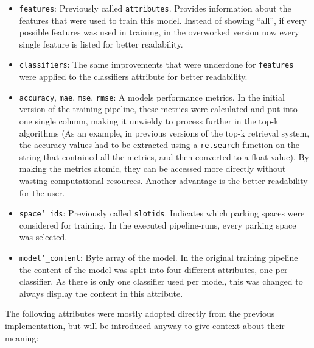 \begin{itemize}
\item  \texttt{features}: Previously called \texttt{attributes}. Provides information about the features that were used to train this model. Instead of showing “all”, if every possible features was used in training, in the overworked version now every single feature is listed for better readability. 
\item  \texttt{classifiers}:  The same improvements that were underdone for \texttt{features} were applied to the classifiers attribute for better readability. 
\item  \texttt{accuracy}, \texttt{mae}, \texttt{mse}, \texttt{rmse}: A models performance metrics. In the initial version of the training pipeline, these metrics were calculated and put into one single column, making it unwieldy to process further in the top-k algorithms (As an example, in previous versions of the top-k retrieval system, the accuracy values had to be extracted using a \texttt{re.search} function on the string that contained all the metrics, and then converted to a float value). By making the metrics atomic, they can be accessed more directly without wasting computational resources. Another advantage is the better readability for the user.
\item \texttt{space\char`_ids}: Previously called \texttt{slotids}.
Indicates which parking spaces were considered for training. In the executed pipeline-runs, every parking space was selected.
\item  \texttt{model\char`_content}: Byte array of the model. In the original training pipeline the content of the model was split into four different attributes, one per classifier. As there is only one classifier used per model, this was changed to always display the content in this attribute.
\end{itemize}

The following attributes were mostly adopted directly from the previous implementation, but will be introduced anyway to give context about their meaning:

